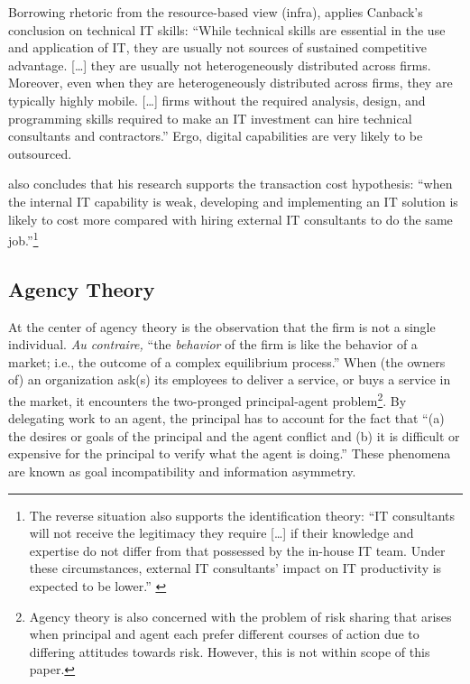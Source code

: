 \documentclass[12pt]{article}
\begin{document}
Borrowing rhetoric from the resource-based view (infra),
\citet[498]{mata1995} applies Canback's conclusion on technical IT
skills: ``While technical skills are essential in the use and
application of IT, they are usually not sources of sustained competitive
advantage. {[}\ldots{]} they are usually not heterogeneously distributed
across firms. Moreover, even when they are heterogeneously distributed
across firms, they are typically highly mobile. {[}\ldots{]} firms
without the required analysis, design, and programming skills required
to make an IT investment can hire technical consultants and
contractors.'' Ergo, digital capabilities are very likely to be
outsourced.

\citet[16-17]{nevo2007} also concludes that his research supports the
transaction cost hypothesis: ``when the internal IT capability is weak,
developing and implementing an IT solution is likely to cost more
compared with hiring external IT consultants to do the same
job.''\footnote{The reverse situation also supports the identification
  theory: ``IT consultants will not receive the legitimacy they require
  {[}\ldots{]} if their knowledge and expertise do not differ from that
  possessed by the in-house IT team. Under these circumstances, external
  IT consultants' impact on IT productivity is expected to be lower.''
  \citep[ 17]{nevo2007}}

\subsection{Agency Theory}\label{agency-theory}

At the center of agency theory is the observation that the firm is not a
single individual. \emph{Au contraire,} ``the \emph{behavior} of the
firm is like the behavior of a market; i.e., the outcome of a complex
equilibrium process.'' \citep[ 311]{jensen1976} When (the owners of) an
organization ask(s) its employees to deliver a service, or buys a
service in the market, it encounters the two-pronged principal-agent
problem\footnote{Agency theory is also concerned with the problem of
  risk sharing that arises when principal and agent each prefer
  different courses of action due to differing attitudes towards risk.
  \citep[ 58]{eisenhardt1989} However, this is not within scope of this
  paper.}. By delegating work to an agent, the principal has to account
for the fact that ``(a) the desires or goals of the principal and the
agent conflict and (b) it is difficult or expensive for the principal to
verify what the agent is doing.'' \citep[ 58]{eisenhardt1989} These
phenomena are known as goal incompatibility and information asymmetry.
\end{document}
